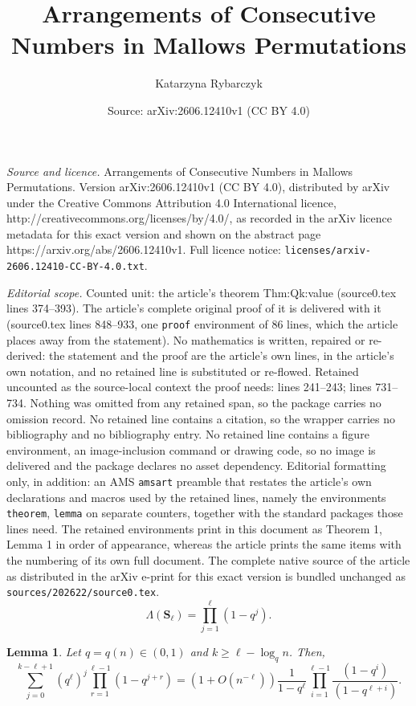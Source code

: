 \documentclass[10pt,a4paper]{amsart}
\title{Arrangements of Consecutive Numbers in Mallows Permutations}
\author{Katarzyna Rybarczyk}
\date{Source: arXiv:2606.12410v1 (CC BY 4.0)}
\newtheorem{lemma}{Lemma}
\newcommand{\bS}{\mathbf{S}}
\renewcommand{\ge}{\geqslant}
\newcommand{\product}{\Lambda}
\begin{document}
\maketitle

\noindent\emph{Source and licence.} Arrangements of Consecutive Numbers in Mallows Permutations. Version arXiv:2606.12410v1 (CC BY 4.0), distributed by arXiv under the Creative Commons Attribution 4.0 International licence, http://creativecommons.org/licenses/by/4.0/, as recorded in the arXiv licence metadata for this exact version and shown on the abstract page https://arxiv.org/abs/2606.12410v1. Full licence notice: \texttt{licenses/arxiv-2606.12410-CC-BY-4.0.txt}.\par\smallskip

\noindent\textit{Editorial scope.} Counted unit: the article's theorem Thm:Qk:value (source0.tex lines 374--393). The article's complete original proof of it is delivered with it (source0.tex lines 848--933, one \texttt{proof} environment of 86 lines, which the article places away from the statement). No mathematics is written, repaired or re-derived: the statement and the proof are the article's own lines, in the article's own notation, and no retained line is substituted or re-flowed.  Retained uncounted as the source-local context the proof needs: lines 241--243; lines 731--734.  Nothing was omitted from any retained span, so the package carries no omission record.  No retained line contains a citation, so the wrapper carries no bibliography and no bibliography entry.  No retained line contains a figure environment, an image-inclusion command or drawing code, so no image is delivered and the package declares no asset dependency.  Editorial formatting only, in addition: an AMS \texttt{amsart} preamble that restates the article's own declarations and macros used by the retained lines, namely the environments \texttt{theorem}, \texttt{lemma} on separate counters, together with the standard packages those lines need.  The retained environments print in this document as Theorem 1, Lemma 1 in order of appearance, whereas the article prints the same items with the numbering of its own full document.  The complete native source of the article as distributed in the arXiv e-print for this exact version is bundled unchanged as \texttt{sources/202622/source0.tex}.
\begin{equation}\label{Eq:Def:Product}
	\product(\bS_\ell)=\prod_{j=1}^{\ell}(1-q^j).
\end{equation}

\begin{lemma}\label{Lem:AuxiliarySum} Let $q =q(n)\in (0,1)$ and $k\ge \ell -\log_q n$. Then, 
	\[\sum_{j=0}^{k-\ell+1}\left(q^{\ell}\right)^j\prod_{r=1}^{\ell-1}(1-q^{j+r})
	=(1+O(n^{-\ell}))\frac{1}{1-q^\ell}\prod_{i=1}^{\ell-1}\frac{(1-q^i)}{(1-q^{\ell+i})}.\]
\end{lemma}
\end{document}

